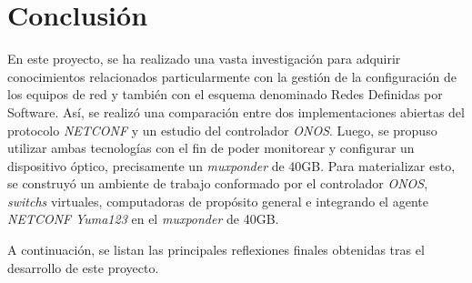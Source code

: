 
\chapter{Conclusión} %

\label{Chapter7} %
En este proyecto, se ha realizado una vasta investigación para adquirir conocimientos relacionados particularmente con la gestión de la configuración de los equipos de red y también con el esquema denominado Redes Definidas por Software. Así, se realizó una comparación entre dos implementaciones abiertas del protocolo \textit{NETCONF} y un estudio del controlador \textit{ONOS}. Luego, se propuso utilizar ambas tecnologías con el fin de poder monitorear y configurar un dispositivo óptico, precisamente un \textit{muxponder} de 40GB. Para materializar esto, se construyó un ambiente de trabajo conformado por el controlador \textit{ONOS}, \textit{switchs} virtuales, computadoras de propósito general e integrando el agente \textit{NETCONF} \textit{Yuma123} en el \textit{muxponder} de 40GB.

A continuación, se listan las principales reflexiones finales obtenidas tras el desarrollo de este proyecto.

